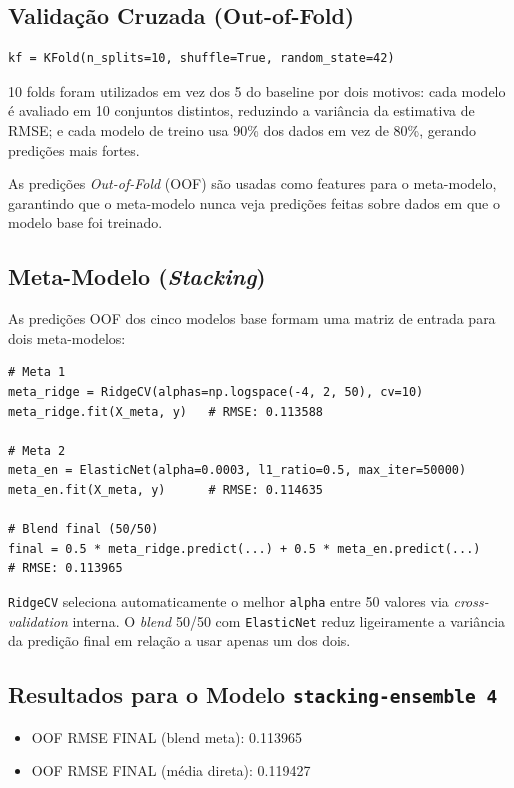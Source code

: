 \documentclass[11pt]{article}
\begin{document}
\subsection{Validação Cruzada (Out-of-Fold)}
\label{sec:orgdf7697c}

\begin{verbatim}
kf = KFold(n_splits=10, shuffle=True, random_state=42)
\end{verbatim}

10 folds foram utilizados em vez dos 5 do baseline por dois motivos: cada modelo é avaliado em 10 conjuntos distintos, reduzindo a variância da estimativa de RMSE; e cada modelo de treino usa 90\% dos dados em vez de 80\%, gerando predições mais fortes.

As predições \emph{Out-of-Fold} (OOF) são usadas como features para o meta-modelo, garantindo que o meta-modelo nunca veja predições feitas sobre dados em que o modelo base foi treinado.
\subsection{Meta-Modelo (\emph{Stacking})}
\label{sec:org9e1f63c}
As predições OOF dos cinco modelos base formam uma matriz de entrada para dois meta-modelos:

\begin{verbatim}
# Meta 1
meta_ridge = RidgeCV(alphas=np.logspace(-4, 2, 50), cv=10)
meta_ridge.fit(X_meta, y)   # RMSE: 0.113588

# Meta 2
meta_en = ElasticNet(alpha=0.0003, l1_ratio=0.5, max_iter=50000)
meta_en.fit(X_meta, y)      # RMSE: 0.114635

# Blend final (50/50)
final = 0.5 * meta_ridge.predict(...) + 0.5 * meta_en.predict(...)
# RMSE: 0.113965
\end{verbatim}

\texttt{RidgeCV} seleciona automaticamente o melhor \texttt{alpha} entre 50 valores via \emph{cross-validation} interna. O \emph{blend} 50/50 com \texttt{ElasticNet} reduz ligeiramente a variância da predição final em relação a usar apenas um dos dois.
\subsection{Resultados para o Modelo \texttt{stacking-ensemble 4}}
\label{sec:orgd89f27f}
\begin{itemize}
\item OOF RMSE FINAL (blend meta):  0.113965
\item OOF RMSE FINAL (média direta): 0.119427
\end{itemize}
\end{document}
